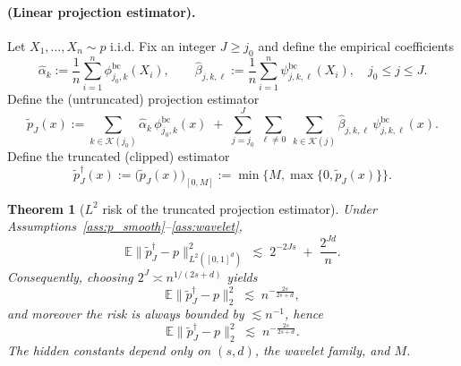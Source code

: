 \documentclass{article}
\theoremstyle{plain}
\newtheorem{theorem}{Theorem}[section]
\theoremstyle{definition}
\def\EE{\mathbb{E}}
\def\calK{\mathcal{K}}
\theoremstyle{plain}
\def\EE{\mathbb{E}}
\def\calK{\mathcal{K}}
\begin{document}
\paragraph{(Linear projection estimator).}
Let $X_1,\dots,X_n \sim p$ i.i.d.
Fix an integer $J\ge j_0$ and define the empirical coefficients
\[
\hat\alpha_{k} := \frac1n \sum_{i=1}^n \phi_{j_0,k}^{\mathrm{bc}}(X_i),
\qquad
\hat\beta_{j,k,\ell} := \frac1n \sum_{i=1}^n \psi^{\mathrm{bc}}_{j,k,\ell}(X_i),\quad j_0\le j\le J.
\]
Define the (untruncated) projection estimator
\[
\tilde p_J(x)
:=
\sum_{k\in\calK(j_0)} \hat\alpha_k\,\phi_{j_0,k}^{\mathrm{bc}}(x)
\;+\;
\sum_{j=j_0}^{J}\ \sum_{\ell\neq 0}\ \sum_{k\in\calK(j)}
\hat\beta_{j,k,\ell}\,\psi^{\mathrm{bc}}_{j,k,\ell}(x).
\]
Define the truncated (clipped) estimator
\[
\tilde p_J^{\dagger}(x) := \big(\tilde p_J(x)\big)_{[0,M]}
:= \min\{M,\max\{0,\tilde p_J(x)\}\}.
\]

\begin{theorem}[$L^2$ risk of the truncated projection estimator]\label{thm:L2_rate_trunc}
Under Assumptions~\ref{ass:p_smooth}--\ref{ass:wavelet},
\[
\EE\|\tilde p_J^{\dagger} - p\|_{L^2([0,1]^d)}^2
\;\lesssim\;
2^{-2Js} \;+\; \frac{2^{Jd}}{n}.
\]
Consequently, choosing $2^J \asymp n^{1/(2s+d)}$ yields
\[
\EE\|\tilde p_J^{\dagger} - p\|_2^2 \;\lesssim\; n^{-\frac{2s}{2s+d}},
\]
and moreover the risk is always bounded by $\lesssim n^{-1}$, hence
\[
\EE\|\tilde p_J^{\dagger} - p\|_2^2 \;\lesssim\; n^{-\frac{2s}{2s+d}}.
\]
The hidden constants depend only on $(s,d)$, the wavelet family, and $M$.
\end{theorem}
\end{document}
